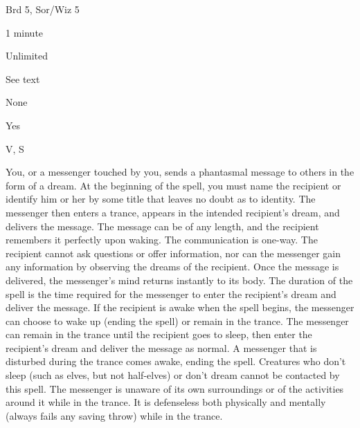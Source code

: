 
\begin{description*}
\item[Level:] Brd 5, Sor/Wiz 5
\item[Casting Time:] 1 minute
\item[Range:] Unlimited
\item[Duration:] See text
\item[Saving Throw:] None
\item[Spell Resistance:] Yes
\item[Components:] V, S
\end{description*}

You, or a messenger touched by you, sends a phantasmal message to others in the
form of a dream. At the beginning of the spell, you must name the recipient or
identify him or her by some title that leaves no doubt as to identity. The messenger
then enters a trance, appears in the intended recipient's dream, and delivers the
message. The message can be of any length, and the recipient remembers it perfectly
upon waking. The communication is one-way. The recipient cannot ask questions or
offer information, nor can the messenger gain any information by observing the
dreams of the recipient.
Once the message is delivered, the messenger's mind returns instantly to its body.
The duration of the spell is the time required for the messenger to enter the recipient's
dream and deliver the message.
If the recipient is awake when the spell begins, the messenger can choose to wake
up (ending the spell) or remain in the trance. The messenger can remain in the
trance until the recipient goes to sleep, then enter the recipient's dream and
deliver the message as normal. A messenger that is disturbed during the trance
comes awake, ending the spell.
Creatures who don't sleep (such as elves, but not half-elves) or don't dream cannot
be contacted by this spell.
The messenger is unaware of its own surroundings or of the activities around it
while in the trance. It is defenseless both physically and mentally (always fails
any saving throw) while in the trance.